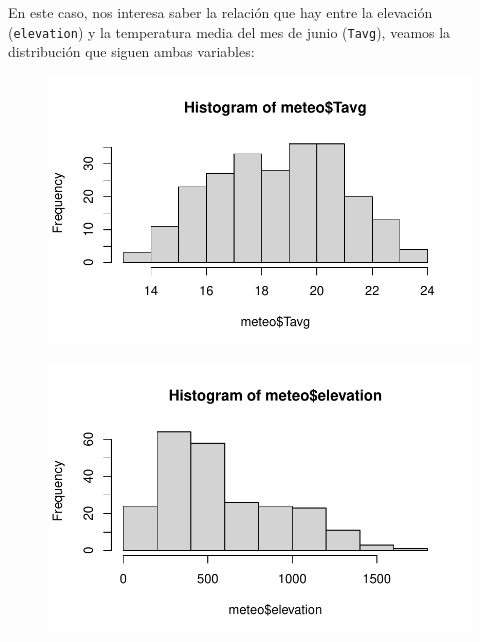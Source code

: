 \documentclass[
  letterpaper,
  DIV=11,
  numbers=noendperiod]{scrreprt}
\newenvironment{Shaded}{\begin{snugshade}}{\end{snugshade}}
\newcommand{\FunctionTok}[1]{\textcolor[rgb]{0.28,0.35,0.67}{#1}}
\newcommand{\NormalTok}[1]{\textcolor[rgb]{0.00,0.23,0.31}{#1}}
\newcommand{\SpecialCharTok}[1]{\textcolor[rgb]{0.37,0.37,0.37}{#1}}
\begin{document}
En este caso, nos interesa saber la relación que hay entre la elevación
(\texttt{elevation}) y la temperatura media del mes de junio
(\texttt{Tavg}), veamos la distribución que siguen ambas variables:

\begin{Shaded}
\end{Shaded}

\begin{figure}[H]

{\centering \includegraphics{01_RegresionLineal_files/figure-pdf/unnamed-chunk-4-1.pdf}

}

\end{figure}

\begin{Shaded}
\end{Shaded}

\begin{figure}[H]

{\centering \includegraphics{01_RegresionLineal_files/figure-pdf/unnamed-chunk-4-2.pdf}

}

\end{figure}
\end{document}
